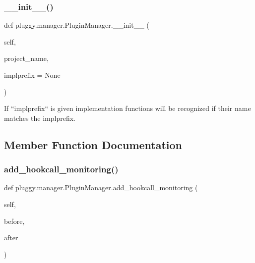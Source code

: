 \subsubsection{\texorpdfstring{\+\_\+\+\_\+init\+\_\+\+\_\+()}{\_\_init\_\_()}}
{\footnotesize\ttfamily def pluggy.\+manager.\+Plugin\+Manager.\+\_\+\+\_\+init\+\_\+\+\_\+ (\begin{DoxyParamCaption}\item[{}]{self,  }\item[{}]{project\+\_\+name,  }\item[{}]{implprefix = {\ttfamily None} }\end{DoxyParamCaption})}

\begin{DoxyVerb}If ``implprefix`` is given implementation functions
will be recognized if their name matches the implprefix. \end{DoxyVerb}
 

\subsection{Member Function Documentation}
\mbox{\label{classpluggy_1_1manager_1_1_plugin_manager_ae4851e61bfbad4b55c2299e4efb57441}} 
\subsubsection{\texorpdfstring{add\+\_\+hookcall\+\_\+monitoring()}{add\_hookcall\_monitoring()}}
{\footnotesize\ttfamily def pluggy.\+manager.\+Plugin\+Manager.\+add\+\_\+hookcall\+\_\+monitoring (\begin{DoxyParamCaption}\item[{}]{self,  }\item[{}]{before,  }\item[{}]{after }\end{DoxyParamCaption})}

